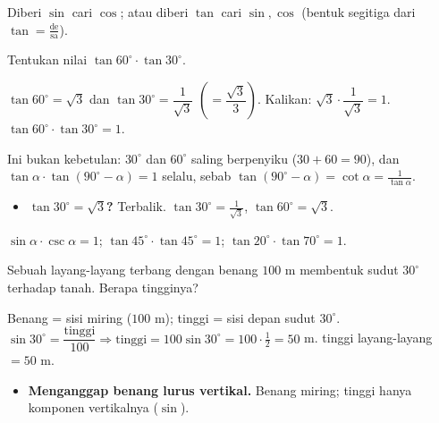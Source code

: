 \begin{variasi}
Diberi $\sin$ cari $\cos$; atau diberi $\tan$ cari $\sin,\cos$ (bentuk segitiga
dari $\tan=\frac{\text{de}}{\text{sa}}$).
\end{variasi}

\begin{soalbox}{}
Tentukan nilai $\tan60^\circ\cdot\tan30^\circ$.
\end{soalbox}

\jawab
{} $\tan60^\circ=\sqrt3$ dan $\tan30^\circ=\dfrac{1}{\sqrt3}$
$\left(=\dfrac{\sqrt3}{3}\right)$.
 Kalikan: $\sqrt3\cdot\dfrac{1}{\sqrt3}=1$.
\jadi $\tan60^\circ\cdot\tan30^\circ=1$.

\begin{tips}
Ini bukan kebetulan: $30^\circ$ dan $60^\circ$ saling berpenyiku
($30+60=90$), dan $\tan\alpha\cdot\tan(90^\circ-\alpha)=1$ selalu, sebab
$\tan(90^\circ-\alpha)=\cot\alpha=\frac{1}{\tan\alpha}$.
\end{tips}

\begin{jebakan}
\begin{itemize}[leftmargin=*,topsep=2pt]
  \item \textbf{$\tan30^\circ=\sqrt3$?} Terbalik. $\tan30^\circ=\frac{1}{\sqrt3}$,
  $\tan60^\circ=\sqrt3$.
\end{itemize}
\end{jebakan}

\begin{variasi}
$\sin\alpha\cdot\csc\alpha=1$; $\tan45^\circ\cdot\tan45^\circ=1$;
$\tan20^\circ\cdot\tan70^\circ=1$.
\end{variasi}

\begin{soalbox}{}
Sebuah layang-layang terbang dengan benang $100$ m membentuk sudut $30^\circ$
terhadap tanah. Berapa tingginya?
\end{soalbox}

\jawab
{} Benang = sisi miring ($100$ m); tinggi = sisi depan sudut $30^\circ$.
 $\sin30^\circ=\dfrac{\text{tinggi}}{100}\Rightarrow
\text{tinggi}=100\sin30^\circ=100\cdot\tfrac12=50$ m.
\jadi tinggi layang-layang $=50$ m.

\begin{jebakan}
\begin{itemize}[leftmargin=*,topsep=2pt]
  \item \textbf{Menganggap benang lurus vertikal.} Benang miring; tinggi hanya
  komponen vertikalnya ($\sin$).
\end{itemize}
\end{jebakan}

